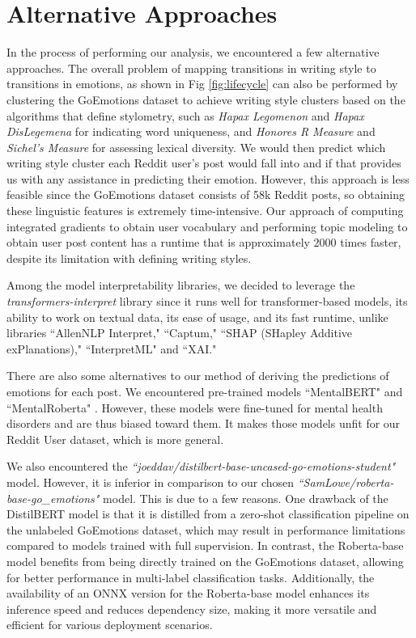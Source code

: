 \documentclass[conference,compsoc]{IEEEtran}
\begin{document}
\section{Alternative Approaches}
In the process of performing our analysis, we encountered a few alternative approaches. 
The overall problem of mapping transitions in writing style to transitions in emotions, as shown in Fig \ref{fig:lifecycle} can also be performed by clustering the GoEmotions dataset to achieve writing style clusters based on the algorithms that define stylometry, such as \textit{Hapax Legomenon} and \textit{Hapax DisLegemena} for indicating word uniqueness, and \textit{Honores R Measure} and \textit{Sichel’s Measure} for assessing lexical diversity. We would then predict which writing style cluster each Reddit user's post would fall into and if that provides us with any assistance in predicting their emotion. However, this approach is less feasible since the GoEmotions dataset consists of 58k Reddit posts, so obtaining these linguistic features is extremely time-intensive. Our approach of computing integrated gradients to obtain user vocabulary and performing topic modeling to obtain user post content has a runtime that is approximately 2000 times faster, despite its limitation with defining writing styles. 

Among the model interpretability libraries, we decided to leverage the \textit{transformers-interpret} library since it runs well for transformer-based models, its ability to work on textual data, its ease of usage, and its fast runtime, unlike libraries ``AllenNLP Interpret," ``Captum," ``SHAP (SHapley Additive exPlanations)," ``InterpretML" and ``XAI." 

There are also some alternatives to our method of deriving the predictions of emotions for each post. We encountered pre-trained models ``MentalBERT" and ``MentalRoberta" \citep{Ji+21:MentalBERT}. However, these models were fine-tuned for mental health disorders and are thus biased toward them. It makes those models unfit for our Reddit User dataset, which is more general.

We also encountered the \textit{``joeddav/distilbert-base-uncased-go-emotions-student"} model. However, it is inferior in comparison to our chosen \textit{``SamLowe/roberta-base-go\_emotions"} model. This is due to a few reasons. One drawback of the DistilBERT model is that it is distilled from a zero-shot classification pipeline on the unlabeled GoEmotions dataset, which may result in performance limitations compared to models trained with full supervision. In contrast, the Roberta-base model benefits from being directly trained on the GoEmotions dataset, allowing for better performance in multi-label classification tasks. Additionally, the availability of an ONNX version for the Roberta-base model enhances its inference speed and reduces dependency size, making it more versatile and efficient for various deployment scenarios.
\end{document}
